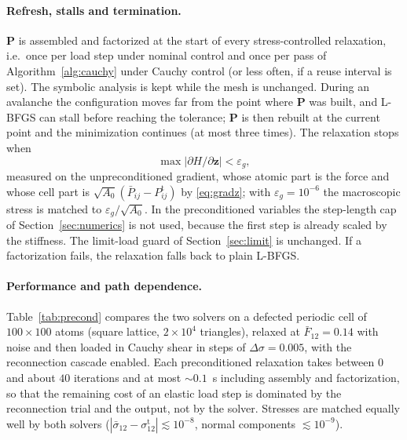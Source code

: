 \documentclass[11pt,a4paper]{article}
\begin{document}
\paragraph{Refresh, stalls and termination.}
\(\mathbf P\) is assembled and factorized at the start of every stress-controlled relaxation, i.e.\
once per load step under nominal control and once per pass of Algorithm~\ref{alg:cauchy} under
Cauchy control (or less often, if a reuse interval is set). The symbolic analysis is kept while
the mesh is unchanged. During an avalanche the configuration moves far from the point where
\(\mathbf P\) was built, and L-BFGS can stall before reaching the tolerance; \(\mathbf P\) is then
rebuilt at the current point and the minimization continues (at most three times). The
relaxation stops when
\begin{equation}
  \max\big|\partial H/\partial\mathbf z\big|<\varepsilon_g ,
\end{equation}
measured on the unpreconditioned gradient, whose atomic part is the force and whose cell part is
\(\sqrt{A_0}(\bar P_{ij}-P^{\mathrm t}_{ij})\) by \eqref{eq:gradz}; with \(\varepsilon_g=10^{-6}\) the
macroscopic stress is matched to \(\varepsilon_g/\sqrt{A_0}\). In the preconditioned variables
the step-length cap of Section~\ref{sec:numerics} is not used, because the first step is already
scaled by the stiffness. The limit-load guard of Section~\ref{sec:limit} is unchanged. If a
factorization fails, the relaxation falls back to plain L-BFGS.

\paragraph{Performance and path dependence.}
Table~\ref{tab:precond} compares the two solvers on a defected periodic cell of
\(100\times100\) atoms (square lattice, \(2\times10^4\) triangles), relaxed at
\(\bar F_{12}=0.14\) with noise and then loaded in Cauchy shear in steps of
\(\Delta\sigma=0.005\), with the reconnection cascade enabled. Each preconditioned relaxation
takes between \(0\) and about \(40\) iterations and at most \(\sim0.1\)~s including assembly and
factorization, so that the remaining cost of an elastic load step is dominated by the
reconnection trial and the output, not by the solver. Stresses are matched equally well by both
solvers (\(|\bar\sigma_{12}-\sigma^{\mathrm t}_{12}|\lesssim10^{-8}\), normal components
\(\lesssim10^{-9}\)).
\end{document}
